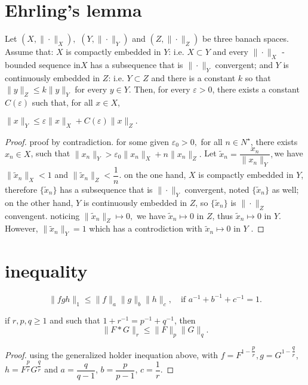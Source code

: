 \section{Ehrling's lemma}
\begin{lemma}
	Let $(X,\|\cdot\|_X),$ $(Y,\|\cdot\|_Y)$ and $(Z,\|\cdot\|_Z)$ be three banach spaces. Assume that:
	$X$ is compactly embedded in $Y$: i.e. $X \subset Y$ and every $\|\cdot\|_X$ -bounded sequence in$ X$ has a subsequence that is $\|\cdot\|_Y$ convergent; and
	$Y$ is continuously embedded in $Z$: i.e. $Y \subset Z$ and there is a constant $k$ so that 
	$\|y\|_Z \leqslant k\|y\|_Y$ for every $y \in Y$.
	Then, for every $\varepsilon > 0$, there exists a constant $C(\varepsilon)$ such that, for all $x \in X$,
	
	${\displaystyle \|x\|_{Y}\leqslant \varepsilon \|x\|_{X}+C(\varepsilon )\|x\|_{Z}}.$
\end{lemma}
\begin{proof}
	proof by contradiction.
	for some given $\varepsilon_0 > 0,$ for all $n \in N^ \star$, there exists $x_n \in X$, such that
	${\displaystyle \|x_n\|_{Y} > \varepsilon_0 \|x_n\|_{X}+n\|x_n\|_{Z}}.$ Let $\tilde{x}_n=\dfrac{x_n}{\|x_n\|_Y},$we have $\|\tilde{x}_n\|_X < 1$ and $\|\tilde{x}_n\|_Z < \dfrac{1}{n}.$ on the one hand, 	$X$ is compactly embedded in $Y$, therefore $\{\tilde{x}_n\}$ has a subsequence that is $\|\cdot\|_Y$ convergent, noted $\{\tilde{x}_n\}$ as well; on the other hand, 	$Y$ is continuously embedded in $Z$, so $\{\tilde{x}_n\}$ is $\|\cdot\|_Z$ convengent. noticing $\|\tilde{x}_n\|_Z\mapsto0,$ we have $ \tilde{x}_n \mapsto 0 $ in $Z$, thus $ \tilde{x}_n \mapsto 0 $ in $Y$. However, $\|\tilde{x}_n\|_Y=1$ which has a controdiction with $ \tilde{x}_n \mapsto 0 $ in $Y$ .
\end{proof}

\section{inequality}
\begin{lemma}
	\begin{equation}
		\|fgh\|_1\leqslant \|f\|_a \|g\|_b \|h\|_c, \quad \text{if } a^{-1} +b^{-1} + c^{-1}=1.
	\end{equation}
\end{lemma}
\begin{lemma}
	\label{le: Young inequality for convolutions}
	if $r,p,q\geqslant1$ and such that $1+r^{-1} = p^{-1}+q^{-1}$, then
	\begin{equation}
		\|F*G\|_r\leqslant\|F\|_p\|G\|_q.
	\end{equation}
	\end{lemma}
\begin{proof}
	using the generalized holder inequation above, with $f=F^{1-\dfrac{p}{r}},g=G^{1-\dfrac{q}{r}}$, $h=F^{\dfrac{p}{r}}G^{\dfrac{q}{r}}$ and $a=\dfrac{q}{q-1}$, $b=\dfrac{p}{p-1}$, $c= \dfrac{1}{r}$.
\end{proof}



